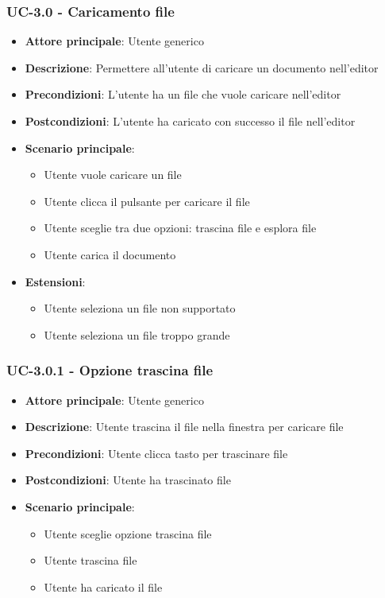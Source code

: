 \documentclass[11pt,a4paper]{article}
\begin{document}
\subsubsection{UC-3.0 - Caricamento file}
\begin{itemize}
    \item \textbf{Attore principale}: Utente generico
    \item \textbf{Descrizione}: Permettere all'utente di caricare un documento nell'editor
    \item \textbf{Precondizioni}: L'utente ha un file che vuole caricare nell'editor
    \item \textbf{Postcondizioni}: L'utente ha caricato con successo il file nell'editor
    \item \textbf{Scenario principale}:
        \begin{itemize}
            \item Utente vuole caricare un file
            \item Utente clicca il pulsante per caricare il file
            \item Utente sceglie tra due opzioni: trascina file e esplora file
            \item Utente carica il documento
        \end{itemize}
    \item \textbf{Estensioni}:
        \begin{itemize}
            \item Utente seleziona un file non supportato
            \item Utente seleziona un file troppo grande
        \end{itemize}
\end{itemize}

\subsubsection{UC-3.0.1 - Opzione trascina file}
\begin{itemize}
    \item \textbf{Attore principale}: Utente generico
    \item \textbf{Descrizione}: Utente trascina il file nella finestra per caricare file
    \item \textbf{Precondizioni}: Utente clicca tasto per trascinare file
    \item \textbf{Postcondizioni}: Utente ha trascinato file
    \item \textbf{Scenario principale}:
        \begin{itemize}
            \item Utente sceglie opzione trascina file
            \item Utente trascina file
            \item Utente ha caricato il file
        \end{itemize}
\end{itemize}
\end{document}

